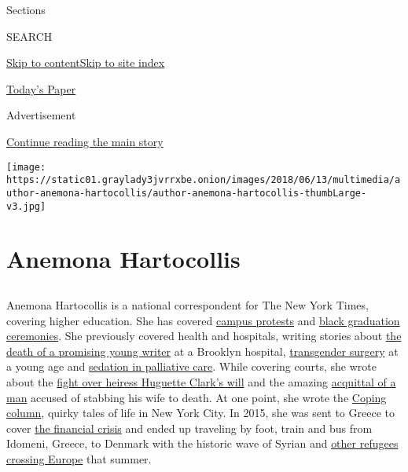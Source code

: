 Sections

SEARCH

\protect\hyperlink{site-content}{Skip to
content}\protect\hyperlink{site-index}{Skip to site index}

\href{https://myaccount.nytimes3xbfgragh.onion/auth/login?response_type=cookie\&client_id=vi}{}

\href{https://www.nytimes3xbfgragh.onion/section/todayspaper}{Today's
Paper}

Advertisement

\protect\hyperlink{after-top}{Continue reading the main story}

\texttt{[image: https://static01.graylady3jvrrxbe.onion/images/2018/06/13/multimedia/author-anemona-hartocollis/author-anemona-hartocollis-thumbLarge-v3.jpg]}

\hypertarget{anemona-hartocollis}{%
\section{Anemona Hartocollis}\label{anemona-hartocollis}}

\subsection{}

Anemona Hartocollis is a national correspondent for The New York Times,
covering higher education. She has covered
\href{https://www.nytimes3xbfgragh.onion/2016/08/05/us/college-protests-alumni-donations.html}{campus
protests} and
\href{https://www.nytimes3xbfgragh.onion/2017/06/02/us/black-commencement-harvard.html}{black
graduation ceremonies}. She previously covered health and hospitals,
writing stories about
\href{http://www.nytimes3xbfgragh.onion/2012/07/29/nyregion/the-short-life-and-lonely-death-of-sabrina-seelig.html}{the
death of a promising young writer} at a Brooklyn hospital,
\href{https://www.nytimes3xbfgragh.onion/2015/06/17/nyregion/transgender-minors-gender-reassignment-surgery.html}{transgender
surgery} at a young age and
\href{http://www.nytimes3xbfgragh.onion/2009/12/27/health/27sedation.html}{sedation
in palliative care}. While covering courts, she wrote about the
\href{http://www.nytimes3xbfgragh.onion/2013/09/15/nyregion/the-two-wills-of-the-heiress-huguette-clark.html}{fight
over heiress Huguette Clark's will} and the amazing
\href{http://www.nytimes3xbfgragh.onion/2007/01/20/nyregion/20murder.html}{acquittal
of a man} accused of stabbing his wife to death. At one point, she wrote
the
\href{http://www.nytimes3xbfgragh.onion/2005/01/09/nyregion/thecity/when-the-foe-next-door-is-a-lot-like-you.html}{Coping
column}, quirky tales of life in New York City. In 2015, she was sent to
Greece to cover
\href{https://www.nytimes3xbfgragh.onion/2015/07/06/world/europe/greeks-emphatic-no-and-a-rebuke-over-austerity.html}{the
financial crisis} and ended up traveling by foot, train and bus from
Idomeni, Greece, to Denmark with the historic wave of Syrian and
\href{https://www.nytimes3xbfgragh.onion/interactive/2015/10/22/world/europe/syrian-refugees.html}{other
refugees crossing Europe} that summer.

